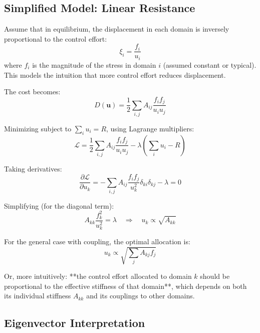 \documentclass[12pt]{article}
\begin{document}
\subsection{Simplified Model: Linear Resistance}

Assume that in equilibrium, the displacement in each domain is inversely proportional to the control effort:
\begin{equation}
\xi_i = \frac{f_i}{u_i}
\end{equation}
where $f_i$ is the magnitude of the stress in domain $i$ (assumed constant or typical). This models the intuition that more control effort reduces displacement.

The cost becomes:
\begin{equation}
D(\boldsymbol{u}) = \frac{1}{2} \sum_{i,j} A_{ij} \frac{f_i f_j}{u_i u_j}
\end{equation}

Minimizing subject to $\sum_i u_i = R$, using Lagrange multipliers:
\begin{equation}
\mathcal{L} = \frac{1}{2} \sum_{i,j} A_{ij} \frac{f_i f_j}{u_i u_j} - \lambda \left( \sum_i u_i - R \right)
\end{equation}

Taking derivatives:
\begin{equation}
\frac{\partial \mathcal{L}}{\partial u_k} = -\sum_{i,j} A_{ij} \frac{f_i f_j}{u_k^2} \delta_{ki} \delta_{kj} - \lambda = 0
\end{equation}

Simplifying (for the diagonal term):
\begin{equation}
A_{kk} \frac{f_k^2}{u_k^2} = \lambda \quad \Rightarrow \quad u_k \propto \sqrt{A_{kk}}
\end{equation}

For the general case with coupling, the optimal allocation is:
\begin{equation}
u_k \propto \sqrt{\sum_j A_{kj} f_j}
\end{equation}

Or, more intuitively: **the control effort allocated to domain $k$ should be proportional to the effective stiffness of that domain**, which depends on both its individual stiffness $A_{kk}$ and its couplings to other domains.

\subsection{Eigenvector Interpretation}
\end{document}
